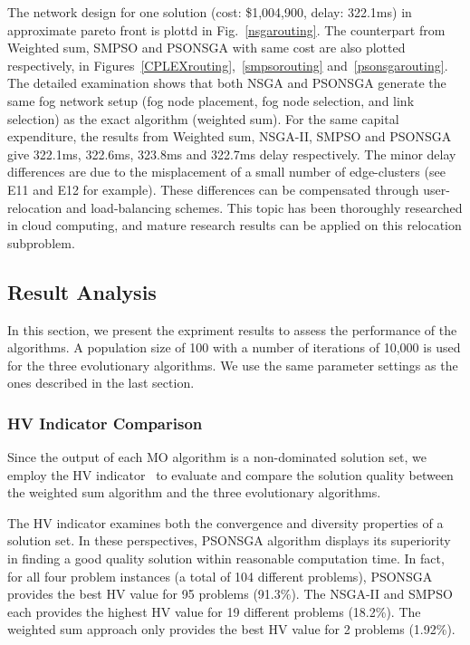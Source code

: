 \documentclass[10pt,journal,compsoc]{IEEEtran}
\newcommand{\Fig}[1]{Fig.~\ref{#1}}
\begin{document}
%
The network design for one solution (cost: \$1,004,900, delay: 322.1ms) in approximate pareto front is plottd in \Fig{nsgarouting}. The counterpart from Weighted sum, SMPSO and PSONSGA with same cost are also plotted respectively, in Figures~\ref{CPLEXrouting},~\ref{smpsorouting} and~\ref{psonsgarouting}. The detailed examination shows that both NSGA and PSONSGA generate the same fog network setup (fog node placement, fog node selection, and link selection) as the exact algorithm (weighted sum). For the same capital expenditure, the results from Weighted sum, NSGA-II, SMPSO and PSONSGA give 322.1ms, 322.6ms, 323.8ms and 322.7ms delay respectively. The minor delay differences are due to the misplacement of a small number of edge-clusters (see E11 and E12 for example). These differences can be compensated through user-relocation and load-balancing schemes. This topic has been thoroughly researched in cloud computing, and mature research results can be applied on this relocation subproblem.


\subsection{Result Analysis}\label{resultanalyssi}
In this section, we present the expriment results to assess the performance of the algorithms.
A population size of 100 with a number of iterations of 10,000 is used for the three evolutionary algorithms. We use the same parameter settings as the ones described in the last section. %


\subsubsection{HV Indicator Comparison}
Since the output of each MO algorithm is a non-dominated solution set, we employ the HV indicator~\cite{Auger:2009:THI:1527125.1527138} to evaluate and compare the solution quality between the weighted sum algorithm and the three evolutionary algorithms. 

The HV indicator examines both the convergence and diversity properties of a solution set. In these perspectives, PSONSGA algorithm displays its superiority in finding a good quality solution within reasonable computation time. In fact, for all four problem instances (a total of 104 different problems), PSONSGA provides the best HV value for 95 problems (91.3\%). The NSGA-II and SMPSO each provides the highest HV value for 19 different problems (18.2\%). The weighted sum approach only provides the best HV value for 2 problems (1.92\%).
\end{document}
